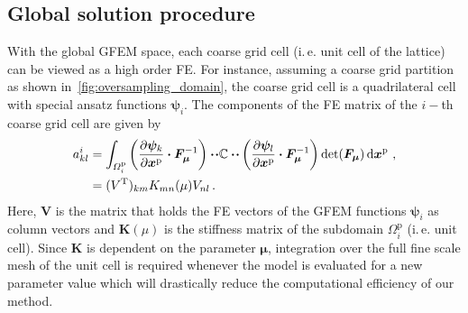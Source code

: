 \documentclass[a4paper]{eccomas_paper-2024}
\makeatletter
\newcommand{\ie}{i.\,e.\@\xspace}
\newcommand{\m}{\bm\mu}
\newcommand{\p}{\mathrm{p}}
\renewcommand{\top}{\mathrm{T}}
\makeatother
\begin{document}
\subsection{Global solution procedure} %
\label{sub:Online efficiency}
With the global GFEM space, each coarse grid cell (\ie{} unit cell of the lattice) can be viewed as a high order FE.
For instance, assuming a coarse grid partition as shown in~\cref{fig:oversampling_domain}, the coarse grid cell is a quadrilateral cell with special ansatz functions $\bm{\psi}_i$.
The components of the FE matrix of the $i-$th coarse grid cell are given by
\begin{align}
    \begin{split}
        a^i_{kl} &= \int_{\varOmega^{\p}_i} \left(\pdv{\bm{\psi}_k}{\bm{x}^{\p}}\vdot\bm{F}^{-1}_{\m}\right)\vdot\!\vdot \mathbb{C} \vdot\!\vdot
    \left(\pdv{\bm{\psi}_l}{\bm{x}^{\p}}\vdot\bm{F}^{-1}_{\m}\right)\det(\bm{F}_{\m})\dd{\bm{x}^{\p}}\,,\\
                 &= ({V}^\top)_{km} {K}_{mn}(\mu){V}_{nl}\,.
    \end{split}
    \label{eq:element_matrix}
\end{align}
Here, $\bm{V}$ is the matrix that holds the FE vectors of the GFEM functions $\bm\psi_i$ as column vectors and $\bm{K}(\mu)$ is the stiffness matrix of the subdomain $\varOmega^{\p}_i$ (\ie{} unit cell).
Since $\bm{K}$ is dependent on the parameter $\m$, integration over the full fine scale mesh of the unit cell is required whenever the model is evaluated for a new parameter value which will drastically reduce the computational efficiency of our method.
\end{document}
